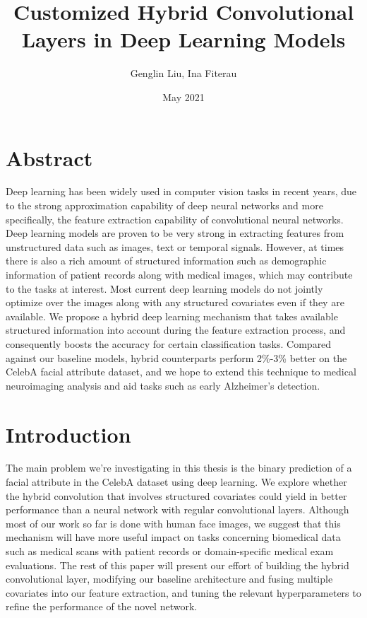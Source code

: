 \documentclass[12pt]{article}
\title{Customized Hybrid Convolutional Layers in Deep Learning Models}
\author{Genglin Liu, Ina Fiterau }
\date{May 2021}
\begin{document}
\maketitle

\section{Abstract}
Deep learning has been widely used in computer vision tasks in recent years, due to the strong approximation capability of deep neural networks and more specifically, the feature extraction capability of convolutional neural networks. Deep learning models are proven to be very strong in extracting features from unstructured data such as images, text or temporal signals. However, at times there is also a rich amount of structured information such as demographic information of patient records along with medical images, which may contribute to the tasks at interest. Most current deep learning models do not jointly optimize over the images along with any structured covariates even if they are available. We propose a hybrid deep learning mechanism that takes available structured information into account during the feature extraction process, and consequently boosts the accuracy for certain classification tasks. Compared against our baseline models, hybrid counterparts perform 2\%-3\% better on the CelebA facial attribute dataset, and we hope to extend this technique to medical neuroimaging analysis and aid tasks such as early Alzheimer's detection.


\section{Introduction}

The main problem we're investigating in this thesis is the binary prediction of a facial attribute in the CelebA dataset using deep learning. We explore whether the hybrid convolution that involves structured covariates could yield in better performance than a neural network with regular convolutional layers. Although most of our work so far is done with human face images, we suggest that this mechanism will have more useful impact on tasks concerning biomedical data such as medical scans with patient records or domain-specific medical exam evaluations. The rest of this paper will present our effort of building the hybrid convolutional layer, modifying our baseline architecture and fusing multiple covariates into our feature extraction, and tuning the relevant hyperparameters to refine the performance of the novel network.
\end{document}
